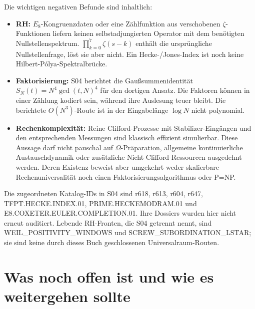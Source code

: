 Die wichtigen negativen Befunde sind inhaltlich:
\begin{itemize}
\item \textbf{RH:} $E_8$-Kongruenzdaten oder eine Zählfunktion aus verschobenen $\zeta$-Funktionen liefern keinen selbstadjungierten Operator mit dem benötigten Nullstellenspektrum. $\prod_{k=0}^7\zeta(s-k)$ enthält die ursprüngliche Nullstellenfrage, löst sie aber nicht. Ein Hecke-/Jones-Index ist noch keine Hilbert-Pólya-Spektralbrücke.
\item \textbf{Faktorisierung:} S04 berichtet die Gaußsummenidentität $S_N(t)=N^4\gcd(t,N)^4$ für den dortigen Ansatz. Die Faktoren können in einer Zählung kodiert sein, während ihre Auslesung teuer bleibt. Die berichtete $O(N^3)$-Route ist in der Eingabelänge $\log N$ nicht polynomial.
\item \textbf{Rechenkomplexität:} Reine Clifford-Prozesse mit Stabilizer-Eingängen und den entsprechenden Messungen sind klassisch effizient simulierbar. Diese Aussage darf nicht pauschal auf $\Omega$-Präparation, allgemeine kontinuierliche Austauschdynamik oder zusätzliche Nicht-Clifford-Ressourcen ausgedehnt werden. Deren Existenz beweist aber umgekehrt weder skalierbare Rechenuniversalität noch einen Faktorisierungsalgorithmus oder P=NP.
\end{itemize}
Die zugeordneten Katalog-IDs in S04 sind r618, r613, r604, r647, TFPT.HECKE.INDEX.01, PRIME.HECKEMODRAM.01 und E8.COXETER.EULER.COMPLETION.01. Ihre Dossiers wurden hier nicht erneut auditiert. Lebende RH-Fronten, die S04 getrennt nennt, sind WEIL\_POSITIVITY\_WINDOWS und SCREW\_SUBORDINATION\_LSTAR; sie sind keine durch dieses Buch geschlossenen Universalraum-Routen.

\chapter{Was noch offen ist und wie es weitergehen sollte}
\label{ch:offen}
